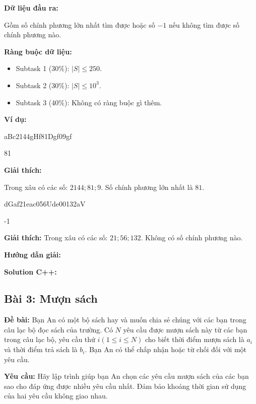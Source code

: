\documentclass[12pt]{scrartcl}  %
\begin{document}
\textbf{Dữ liệu đầu ra:}

Gồm số chính phương lớn nhất tìm được hoặc số $-1$ nếu không tìm được số chính phương nào.

\textbf{Ràng buộc dữ liệu:}
\begin{itemize}
    \item Subtask 1 (30\%): $|S| \leq 250$.
    \item Subtask 2 (30\%): $|S| \leq 10^3$.
    \item Subtask 3 (40\%): Không có ràng buộc gì thêm.
\end{itemize}

\textbf{Ví dụ:}
\begin{tcolorbox}[colback=gray!5!white, colframe=blue!50!black, title=Input]
aBc2144gHf81Dgf09gf
\end{tcolorbox}

\begin{tcolorbox}[colback=gray!5!white, colframe=green!50!black, title=Output]
81
\end{tcolorbox}

\textbf{Giải thích:}

Trong xâu có các số: $2144; 81; 9$. Số chính phương lớn nhất là $81$.

\begin{tcolorbox}[colback=gray!5!white, colframe=blue!50!black, title=Input]
dGaf21eac056Ude00132aV
\end{tcolorbox}

\begin{tcolorbox}[colback=gray!5!white, colframe=green!50!black, title=Output]
-1
\end{tcolorbox}

\textbf{Giải thích:}
Trong xâu có các số: $21; 56; 132$. Không có số chính phương nào.

\textbf{Hướng dẫn giải:}

\textbf{Solution C++:}

\subsection{Bài 3: Mượn sách}
\textbf{Đề bài:}
Bạn An có một bộ sách hay và muốn chia sẻ chúng với các bạn trong câu lạc bộ đọc sách 
của trường. Có $N$ yêu cầu được mượn sách này từ các bạn trong câu lạc bộ, yêu cầu thứ $i (1 \le i \le N)$ cho biết thời điểm 
mượn sách là $a_i$ và thời điểm trả sách là $b_i$. Bạn An có thể chấp nhận hoặc từ chối đối với một yêu cầu. 

\textbf{Yêu cầu:}
Hãy lập trình giúp bạn An chọn các yêu cầu mượn sách của các bạn sao cho đáp ứng được nhiều yêu cầu nhất. Đảm bảo khoảng thời gian sử dụng của hai yêu cầu không giao nhau.
\end{document}
